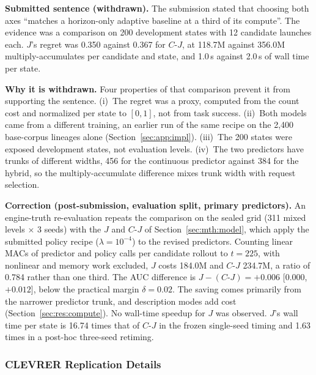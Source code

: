 \begin{revblock}
\textbf{Submitted sentence (withdrawn).} The submission stated that choosing both axes ``matches a horizon-only adaptive baseline at a third of its compute''. The evidence was a comparison on 200 development states with 12 candidate launches each. $J$'s regret was 0.350 against 0.367 for $C\text{-}J$, at 118.7M against 356.0M multiply-accumulates per candidate and state, and 1.0\,s against 2.0\,s of wall time per state.

\textbf{Why it is withdrawn.} Four properties of that comparison prevent it from supporting the sentence. (i)~The regret was a proxy, computed from the count cost and normalized per state to $[0,1]$, not from task success. (ii)~Both models came from a different training, an earlier run of the same recipe on the 2,400 base-corpus lineages alone (Section~\ref{sec:app:impl}). (iii)~The 200 states were exposed development states, not evaluation levels. (iv)~The two predictors have trunks of different widths, 456 for the continuous predictor against 384 for the hybrid, so the multiply-accumulate difference mixes trunk width with request selection.

\textbf{Correction (post-submission, evaluation split, primary predictors).} An engine-truth re-evaluation repeats the comparison on the sealed grid (311 mixed levels $\times$ 3 seeds) with the $J$ and $C\text{-}J$ of Section~\ref{sec:mth:model}, which apply the submitted policy recipe ($\lambda=10^{-4}$) to the revised predictors. Counting linear MACs of predictor and policy calls per candidate rollout to $t=225$, with nonlinear and memory work excluded, $J$ costs 184.0M and $C\text{-}J$ 234.7M, a ratio of 0.784 rather than one third. The AUC difference is $J-(C\text{-}J)=+0.006$ [$0.000$, $+0.012$], below the practical margin $\delta=0.02$. The saving comes primarily from the narrower predictor trunk, and description modes add cost (Section~\ref{sec:res:compute}). No wall-time speedup for $J$ was observed. $J$'s wall time per state is 16.74 times that of $C\text{-}J$ in the frozen single-seed timing and 1.63 times in a post-hoc three-seed retiming.
\end{revblock}

\subsubsection{CLEVRER Replication Details}
\label{sec:app:clevrer}

